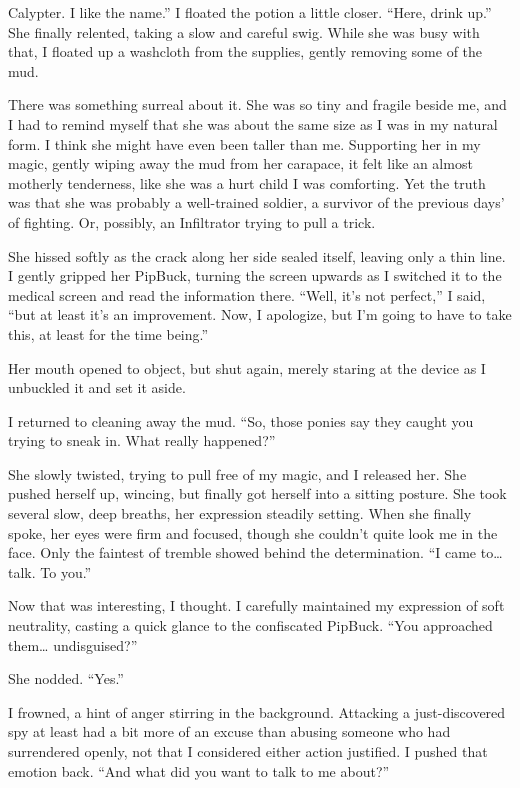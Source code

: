 \leavevmode{}Calypter. I like the name.” I floated the potion a little closer. “Here, drink up.” She finally relented, taking a slow and careful swig. While she was busy with that, I floated up a washcloth from the supplies, gently removing some of the mud.

There was something surreal about it. She was so tiny and fragile beside me, and I had to remind myself that she was about the same size as I was in my natural form. I think she might have even been taller than me. Supporting her in my magic, gently wiping away the mud from her carapace, it felt like an almost motherly tenderness, like she was a hurt child I was comforting. Yet the truth was that she was probably a well-trained soldier, a survivor of the previous days’ of fighting. Or, possibly, an Infiltrator trying to pull a trick.

She hissed softly as the crack along her side sealed itself, leaving only a thin line. I gently gripped her PipBuck, turning the screen upwards as I switched it to the medical screen and read the information there. “Well, it’s not perfect,” I said, “but at least it’s an improvement. Now, I apologize, but I’m going to have to take this, at least for the time being.”

Her mouth opened to object, but shut again, merely staring at the device as I unbuckled it and set it aside.

I returned to cleaning away the mud. “So, those ponies say they caught you trying to sneak in. What really happened?”

She slowly twisted, trying to pull free of my magic, and I released her. She pushed herself up, wincing, but finally got herself into a sitting posture. She took several slow, deep breaths, her expression steadily setting. When she finally spoke, her eyes were firm and focused, though she couldn’t quite look me in the face. Only the faintest of tremble showed behind the determination. “I came to… talk. To you.”

Now that was interesting, I thought. I carefully maintained my expression of soft neutrality, casting a quick glance to the confiscated PipBuck. “You approached them… undisguised?”

She nodded. “Yes.”

I frowned, a hint of anger stirring in the background. Attacking a just-discovered spy at least had a bit more of an excuse than abusing someone who had surrendered openly, not that I considered either action justified. I pushed that emotion back. “And what did you want to talk to me about?”


